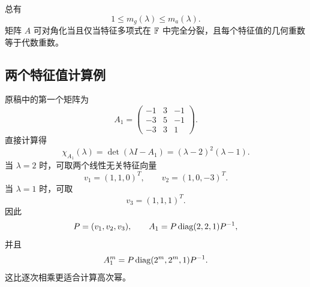 \begin{theorem}
总有
\begin{equation}
 1\leq m_g(\lambda)\leq m_a(\lambda).
\end{equation}
矩阵 $A$ 可对角化当且仅当特征多项式在 $\mathbb F$ 中完全分裂，且每个特征值的几何重数等于代数重数。
\end{theorem}

\subsection{两个特征值计算例}

\begin{example}[可对角化矩阵及其幂]
原稿中的第一个矩阵为
\begin{equation}
 A_1=\begin{pmatrix}
 -1&3&-1\\
 -3&5&-1\\
 -3&3&1
 \end{pmatrix}.
\end{equation}
直接计算得
\begin{equation}
 \chi_{A_1}(\lambda)
 =\det(\lambda I-A_1)
 =(\lambda-2)^2(\lambda-1).
\end{equation}
当 $\lambda=2$ 时，可取两个线性无关特征向量
\begin{equation}
 v_1=(1,1,0)^T,
 \qquad
 v_2=(1,0,-3)^T.
\end{equation}
当 $\lambda=1$ 时，可取
\begin{equation}
 v_3=(1,1,1)^T.
\end{equation}
因此
\begin{equation}
 P=(v_1,v_2,v_3),
 \qquad
 A_1=P\operatorname{diag}(2,2,1)P^{-1},
\end{equation}
并且
\begin{equation}
 A_1^m=P\operatorname{diag}(2^m,2^m,1)P^{-1}.
\end{equation}
这比逐次相乘更适合计算高次幂。
\end{example}

